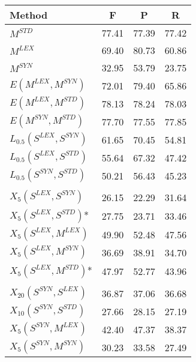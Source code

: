 \begin{table}[]
\centering
\setlength\tabcolsep{2.75pt}
\begin{tabular}{@{\makebox[1.50em][l]{\rownumber\space}}lccc@{}}
\toprule
\textbf{Method} & \textbf{F} & \textbf{P} & \textbf{R}\\ \midrule
$M^{STD}$                    & 77.41 & 77.39 & 77.42  \\ 
$M^{LEX}$                    & 69.40 & 80.73 & 60.86 \\
$M^{SYN}$                    & 32.95 & 53.79 & 23.75 \\ 
\midrule
$E(M^{LEX}, M^{SYN})$        & 72.01 & 79.40  & 65.86 \\
$E(M^{LEX}, M^{STD})$        & 78.13 & 78.24 & 78.03 \\
$E(M^{SYN}, M^{STD})$        & 77.70 & 77.55 & 77.85 \\
\midrule
$L_{0.5}(S^{LEX}, S^{SYN})$  & 61.65 & 70.45 & 54.81 \\
$L_{0.5}(S^{LEX}, S^{STD})$  & 55.64   & 67.32 & 47.42 \\
$L_{0.5}(S^{SYN}, S^{STD})$  & 50.21 & 56.43 & 45.23 \\ 
\midrule	
                             &       &       &       \\
$X_5(S^{LEX}, S^{SYN})$      & 26.15           & 22.29           & 31.64           \\
$X_5(S^{LEX}, S^{STD})$*  & 27.75         & 23.71            & 33.46     \\ 
$X_5(S^{LEX}, M^{LEX})$  & 49.90           & 52.48            & 47.56           \\ 
$X_5(S^{LEX}, M^{SYN})$  & 36.69           & 38.91            & 34.70           \\ 
$X_5(S^{LEX}, M^{STD})$* & 47.97           & 52.77            & 43.96           \\  
%
                             &       &       &       \\
$X_{20}(S^{SYN}, S^{LEX})$     & 36.87          & 37.06           & 36.68           \\
$X_{10}(S^{SYN}, S^{STD})$  & 27.66           & 28.15            & 27.19     \\ 
$X_5(S^{SYN}, M^{LEX})$ &  42.40          & 47.37            & 38.37          \\ 
$X_5(S^{SYN}, M^{SYN})$  & 30.23           & 33.58            & 27.49           \\ 

\end{tabular}
\end{table}
